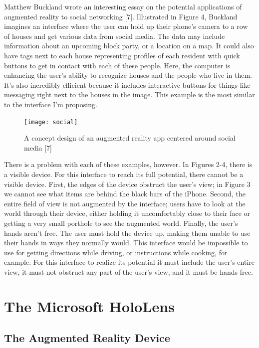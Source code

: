 \documentclass[a4paper,12pt]{article}
\begin{document}
Matthew Buckland wrote an interesting essay on the potential applications of augmented reality to social networking [7]. Illustrated in Figure 4, Buckland imagines an interface where the user can hold up their phone's camera to a row of houses and get various data from social media. The data may include information about an upcoming block party, or a location on a map. It could also have tags next to each house representing profiles of each resident with quick buttons to get in contact with each of these people. Here, the computer is enhancing the user's ability to recognize houses and the people who live in them. It's also incredibly efficient because it includes interactive buttons for things like messaging right next to the houses in the image. This example is the most similar to the interface I'm proposing.

\begin{figure}
\centering
\texttt{[image: social]}
\caption{A concept design of an augmented reality app centered around social media [7]}
\end{figure}

There is a problem with each of these examples, however. In Figures 2-4, there is a visible device. For this interface to reach its full potential, there cannot be a visible device. First, the edges of the device obstruct the user's view; in Figure 3 we cannot see what items are behind the black bars of the iPhone. Second, the entire field of view is not augmented by the interface; users have to look at the world through their device, either holding it uncomfortably close to their face or getting a very small porthole to see the augmented world. Finally, the user's hands aren't free. The user must hold the device up, making them unable to use their hands in ways they normally would. This interface would be impossible to use for getting directions while driving, or instructions while cooking, for example. For this interface to realize its potential it must include the user's entire view, it must not obstruct any part of the user's view, and it must be hands free. 



\section{The Microsoft HoloLens}

\subsection{The Augmented Reality Device}
\end{document}
